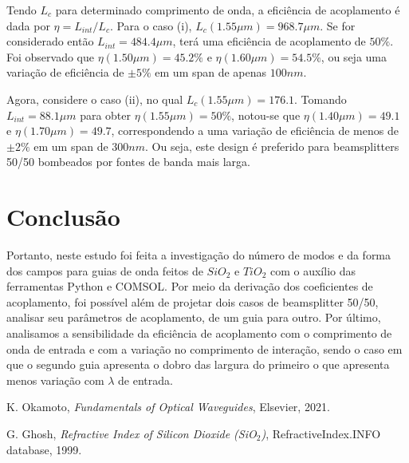 \documentclass[final,12pt,times,twocolumn]{elsarticle}
\begin{document}
Tendo $L_c$ para determinado comprimento de onda, a eficiência de acoplamento é dada por $\eta = L_{int} / L_c$. Para o caso (i), $L_c(1.55\mu m) = 968.7\mu m$. Se for considerado então $L_{int} = 484.4\mu m$, terá uma eficiência de acoplamento de $50\%$. Foi observado que $\eta(1.50\mu m) = 45.2\%$ e $\eta(1.60\mu m) = 54.5\%$, ou seja uma variação de eficiência de $\pm 5\%$ em um span de apenas $100nm$.

Agora, considere o caso (ii), no qual $L_c(1.55\mu m) = 176.1$. Tomando $L_{int} = 88.1 \mu m$ para obter $\eta(1.55\mu m) = 50\%$, notou-se que $\eta(1.40\mu m) = 49.1$ e $\eta(1.70\mu m) = 49.7$, correspondendo a uma variação de eficiência de menos de $\pm 2\%$ em um span de $300nm$. Ou seja, este design é preferido para beamsplitters 50/50 bombeados por fontes de banda mais larga. 

\section{Conclusão}
\label{sec:conclusion}

Portanto, neste estudo foi feita a investigação do número de modos e da forma dos campos para guias de onda feitos de $SiO_2$ e $TiO_2$ com o auxílio das ferramentas Python e COMSOL. Por meio da derivação dos coeficientes de acoplamento, foi possível além de projetar dois casos de beamsplitter 50/50, analisar seu parâmetros de acoplamento, de um guia para outro. Por último, analisamos a sensibilidade da eficiência de acoplamento com o comprimento de onda de entrada e com a variação no comprimento de interação, sendo o caso em que o segundo guia apresenta  o dobro das largura do primeiro o que apresenta menos variação com $\lambda$ de entrada.

\begin{thebibliography}{99}

K. Okamoto, \textit{Fundamentals of Optical Waveguides}, Elsevier, 2021.

G. Ghosh, \textit{Refractive Index of Silicon Dioxide (SiO$_2$)}, RefractiveIndex.INFO database, 1999.

\end{thebibliography}
\end{document}
